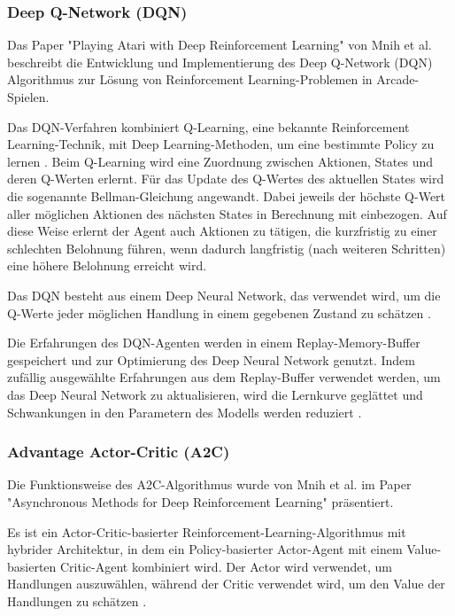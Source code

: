 \documentclass[oneside,bibliography=totocnumbered,BCOR=5mm]{scrbook}%
\theoremstyle{definition}
\theoremstyle{definition}
\theoremstyle{definition}
\theoremstyle{definition}
\theoremstyle{definition}
\theoremstyle{definition}
\begin{document}
\subsubsection{Deep Q-Network (DQN)}
Das Paper "Playing Atari with Deep Reinforcement Learning" von 
  Mnih et al. beschreibt die Entwicklung und Implementierung des Deep Q-Network (DQN) 
  Algorithmus zur Lösung von Reinforcement Learning-Problemen in Arcade-Spielen.

  Das DQN-Verfahren kombiniert Q-Learning, eine bekannte Reinforcement Learning-Technik, 
  mit Deep Learning-Methoden, um eine bestimmte Policy zu lernen \autocite[Seite 4]{DQN}.
  Beim Q-Learning wird eine Zuordnung zwischen Aktionen, States und deren Q-Werten erlernt.
  Für das Update des Q-Wertes des aktuellen States wird die sogenannte Bellman-Gleichung angewandt.
  Dabei jeweils der höchste Q-Wert aller möglichen Aktionen des nächsten States in Berechnung mit einbezogen. 
  Auf diese Weise erlernt der Agent auch Aktionen zu tätigen, die kurzfristig zu einer schlechten
  Belohnung führen, wenn dadurch langfristig (nach weiteren Schritten) eine höhere Belohnung erreicht wird.

  Das DQN besteht aus einem Deep Neural Network, das verwendet wird, 
  um die Q-Werte jeder möglichen Handlung in einem gegebenen Zustand zu schätzen \autocite[Seite 5]{DQN}. 
 
  Die Erfahrungen des DQN-Agenten werden in einem Replay-Memory-Buffer gespeichert und 
  zur Optimierung des Deep Neural Network genutzt. 
  Indem zufällig ausgewählte Erfahrungen aus dem Replay-Buffer verwendet werden, um das Deep Neural Network zu aktualisieren,
  wird die Lernkurve geglättet und Schwankungen in den Parametern des Modells werden reduziert \autocite[Seite 5]{DQN}.\\
  \linebreak[4]
 
\subsubsection{Advantage Actor-Critic (A2C)} 
Die Funktionsweise des A2C-Algorithmus wurde von Mnih et al. im Paper 
  "Asynchronous Methods for Deep Reinforcement Learning" präsentiert. 

  Es ist ein Actor-Critic-basierter Reinforcement-Learning-Algorithmus 
  mit hybrider Architektur, in dem ein Policy-basierter Actor-Agent mit 
  einem Value-basierten Critic-Agent kombiniert wird. 
  Der Actor wird verwendet, um Handlungen auszuwählen, 
  während der Critic verwendet wird, um den Value der Handlungen zu schätzen \autocite[Seite 3]{A2C}.
\end{document}
